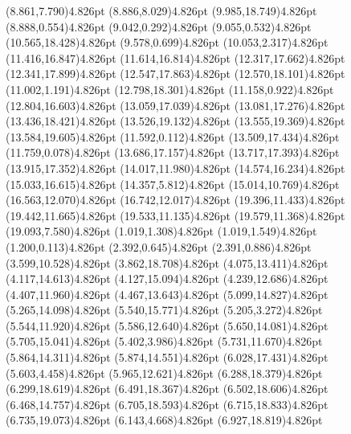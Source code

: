 \documentclass[10pt]{article}
\begin{document}
{{\qdisk(8.861,7.790){4.826pt}%
\qdisk(8.886,8.029){4.826pt}%
\qdisk(9.985,18.749){4.826pt}%
\qdisk(8.888,0.554){4.826pt}%
\qdisk(9.042,0.292){4.826pt}%
\qdisk(9.055,0.532){4.826pt}%
\qdisk(10.565,18.428){4.826pt}%
\qdisk(9.578,0.699){4.826pt}%
\qdisk(10.053,2.317){4.826pt}%
\qdisk(11.416,16.847){4.826pt}%
\qdisk(11.614,16.814){4.826pt}%
\qdisk(12.317,17.662){4.826pt}%
\qdisk(12.341,17.899){4.826pt}%
\qdisk(12.547,17.863){4.826pt}%
\qdisk(12.570,18.101){4.826pt}%
\qdisk(11.002,1.191){4.826pt}%
\qdisk(12.798,18.301){4.826pt}%
\qdisk(11.158,0.922){4.826pt}%
\qdisk(12.804,16.603){4.826pt}%
\qdisk(13.059,17.039){4.826pt}%
\qdisk(13.081,17.276){4.826pt}%
\qdisk(13.436,18.421){4.826pt}%
\qdisk(13.526,19.132){4.826pt}%
\qdisk(13.555,19.369){4.826pt}%
\qdisk(13.584,19.605){4.826pt}%
\qdisk(11.592,0.112){4.826pt}%
\qdisk(13.509,17.434){4.826pt}%
\qdisk(11.759,0.078){4.826pt}%
\qdisk(13.686,17.157){4.826pt}%
\qdisk(13.717,17.393){4.826pt}%
\qdisk(13.915,17.352){4.826pt}%
\qdisk(14.017,11.980){4.826pt}%
\qdisk(14.574,16.234){4.826pt}%
\qdisk(15.033,16.615){4.826pt}%
\qdisk(14.357,5.812){4.826pt}%
\qdisk(15.014,10.769){4.826pt}%
\qdisk(16.563,12.070){4.826pt}%
\qdisk(16.742,12.017){4.826pt}%
\qdisk(19.396,11.433){4.826pt}%
\qdisk(19.442,11.665){4.826pt}%
\qdisk(19.533,11.135){4.826pt}%
\qdisk(19.579,11.368){4.826pt}%
\qdisk(19.093,7.580){4.826pt}%
\dummycolor
\qdisk(1.019,1.308){4.826pt}%
\qdisk(1.019,1.549){4.826pt}%
\qdisk(1.200,0.113){4.826pt}%
\qdisk(2.392,0.645){4.826pt}%
\qdisk(2.391,0.886){4.826pt}%
\qdisk(3.599,10.528){4.826pt}%
\qdisk(3.862,18.708){4.826pt}%
\qdisk(4.075,13.411){4.826pt}%
\qdisk(4.117,14.613){4.826pt}%
\qdisk(4.127,15.094){4.826pt}%
\qdisk(4.239,12.686){4.826pt}%
\qdisk(4.407,11.960){4.826pt}%
\qdisk(4.467,13.643){4.826pt}%
\qdisk(5.099,14.827){4.826pt}%
\qdisk(5.265,14.098){4.826pt}%
\qdisk(5.540,15.771){4.826pt}%
\qdisk(5.205,3.272){4.826pt}%
\qdisk(5.544,11.920){4.826pt}%
\qdisk(5.586,12.640){4.826pt}%
\qdisk(5.650,14.081){4.826pt}%
\qdisk(5.705,15.041){4.826pt}%
\qdisk(5.402,3.986){4.826pt}%
\qdisk(5.731,11.670){4.826pt}%
\qdisk(5.864,14.311){4.826pt}%
\qdisk(5.874,14.551){4.826pt}%
\qdisk(6.028,17.431){4.826pt}%
\qdisk(5.603,4.458){4.826pt}%
\qdisk(5.965,12.621){4.826pt}%
\qdisk(6.288,18.379){4.826pt}%
\qdisk(6.299,18.619){4.826pt}%
\qdisk(6.491,18.367){4.826pt}%
\qdisk(6.502,18.606){4.826pt}%
\qdisk(6.468,14.757){4.826pt}%
\qdisk(6.705,18.593){4.826pt}%
\qdisk(6.715,18.833){4.826pt}%
\qdisk(6.735,19.073){4.826pt}%
\qdisk(6.143,4.668){4.826pt}%
\qdisk(6.927,18.819){4.826pt}%
}}
\end{document}
